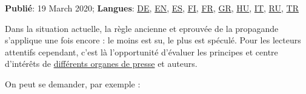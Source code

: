\textbf{Publié}: 19 March 2020; \textbf{Langues}:
\href{https://swprs.org/corona-medien-propaganda/}{DE},
\href{https://swprs.org/corona-media-propaganda/}{EN},
\href{http://piensachile.com/2020/03/corona-medios-de-comunicacion-propaganda/}{ES},
\href{https://swprs.org/koronasta-mediasta-ja-propagandasta/}{FI},
\href{https://swprs.org/sur-le-coronavirus-les-medias-et-la-propagande/}{FR},
\href{https://swprs.org/corona-media-propaganda-greek/}{GR},
\href{https://swprs.org/korona-media-propaganda/}{HU},
\href{https://swprs.org/corona-media-propaganda-it/}{IT},
\href{https://swprs.org/\%d0\%be-\%d0\%ba\%d0\%be\%d1\%80\%d0\%be\%d0\%bd\%d0\%b0\%d0\%b2\%d0\%b8\%d1\%80\%d1\%83\%d1\%81\%d0\%b5-\%d1\%81\%d0\%bc\%d0\%b8-\%d0\%b8-\%d0\%bf\%d1\%80\%d0\%be\%d0\%bf\%d0\%b0\%d0\%b3\%d0\%b0\%d0\%bd\%d0\%b4\%d0\%b5/}{RU},
\href{https://swprs.org/korona-medya-ve-propaganda-uezerine/}{TR}

Dans la situation actuelle, la règle ancienne et eprouvée de la
propagande s'applique une fois encore : le moins est su, le plus est
spéculé. Pour les lecteurs attentifs cependant, c'est là l'opportunité
d'évaluer les principes et centre d'intérêts de
\href{https://swprs.org/media-navigator/}{différents organes de presse}
et auteurs.

On peut se demander, par exemple :

